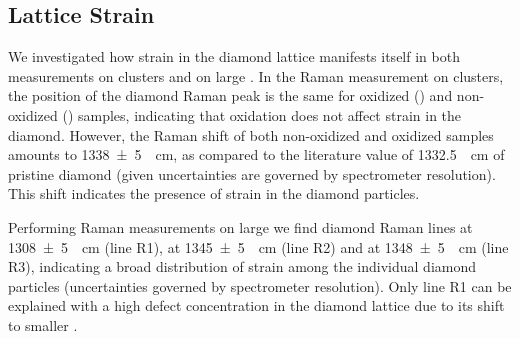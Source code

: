 			\subsection{Lattice Strain}\label{subsec::raman_strain}

				We investigated how strain in the diamond lattice manifests itself in both measurements on \nd clusters and on large \nds.
				In the Raman measurement on \nd clusters, the position of the diamond Raman peak is the same for oxidized (\insituSo) and non-oxidized (\insituSn) samples, indicating that oxidation does not affect strain in the diamond.
				However, the Raman shift of both non-oxidized and oxidized samples amounts to \SI[separate-uncertainty]{1338+-5}{\per\centi\meter}, as compared to the literature value of \SI{1332.5}{\per\centi\meter} of pristine diamond \cite{Zaitsev2001} (given uncertainties are governed by spectrometer resolution).
				This shift indicates the presence of strain in the diamond particles.
				
				Performing Raman measurements on large \nds we find diamond Raman lines at \SI[separate-uncertainty]{1308+-5}{\per\centi\meter} (line R1), at \SI[separate-uncertainty]{1345+-5}{\per\centi\meter} (line R2) and at \SI[separate-uncertainty]{1348+-5}{\per\centi\meter} (line R3), indicating a broad distribution of strain among the individual diamond particles (uncertainties governed by spectrometer resolution).
				Only line R1 can be explained with a high defect concentration in the diamond lattice due to its shift to smaller \wl.
				
% 

